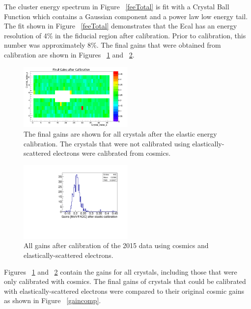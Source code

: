 \documentclass[twoside]{article}
\begin{document}
\begin{multicols}{2}
	The cluster energy spectrum in Figure ~\ref{feeTotal} is fit with a Crystal Ball Function which contains a Gaussian component and a power law low energy tail. The fit shown in Figure ~\ref{feeTotal} demonstrates that the Ecal has an energy resolution of 4\% in the fiducial region after calibration. Prior to calibration, this number was approximately 8\%. The final gains that were obtained from calibration are shown in Figures ~\ref{feegains} and ~\ref{feegains1D}. 
	
\begin{figure}[H]
  \centering
      \includegraphics[width=0.5\textwidth]{pics/finalGains.png}
  \caption{The final gains are shown for all crystals after the elastic energy calibration. The crystals that were not calibrated using elastically-scattered electrons were calibrated from cosmics.}
  \label{feegains}
\end{figure}

\begin{figure}[H]
  \centering
      \includegraphics[width=0.5\textwidth]{pics/fee_2015gains.pdf}
  \caption{All gains after calibration of the 2015 data using cosmics and elastically-scattered electrons.}
  \label{feegains1D}
\end{figure}

Figures ~\ref{feegains} and ~\ref{feegains1D} contain the gains for all crystals, including those that were only calibrated with cosmics. The final gains of crystals that could be calibrated with elastically-scattered electrons were compared to their original cosmic gains as shown in Figure ~\ref{gaincomp}.
	

\end{multicols}
\end{document}
